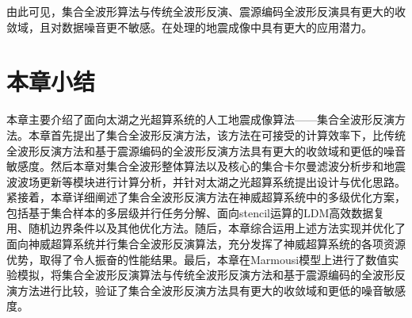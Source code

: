 由此可见，集合全波形算法与传统全波形反演、震源编码全波形反演具有更大的收敛域，且对数据噪音更不敏感。在处理的地震成像中具有更大的应用潜力。


\section{本章小结} %
\label{sec:本章小结}

本章主要介绍了面向太湖之光超算系统的人工地震成像算法——集合全波形反演方法。本章首先提出了集合全波形反演方法，该方法在可接受的计算效率下，比传统全波形反演方法和基于震源编码的全波形反演方法具有更大的收敛域和更低的噪音敏感度。然后本章对集合全波形整体算法以及核心的集合卡尔曼滤波分析步和地震波波场更新等模块进行计算分析，并针对太湖之光超算系统提出设计与优化思路。紧接着，本章详细阐述了集合全波形反演方法在神威超算系统中的多级优化方案，包括基于集合样本的多层级并行任务分解、面向stencil运算的LDM高效数据复用、随机边界条件以及其他优化方法。随后，本章综合运用上述方法实现并优化了面向神威超算系统并行集合全波形反演算法，充分发挥了神威超算系统的各项资源优势，取得了令人振奋的性能结果。最后，本章在Marmousi模型上进行了数值实验模拟，将集合全波形反演算法与传统全波形反演方法和基于震源编码的全波形反演方法进行比较，验证了集合全波形反演方法具有更大的收敛域和更低的噪音敏感度。

